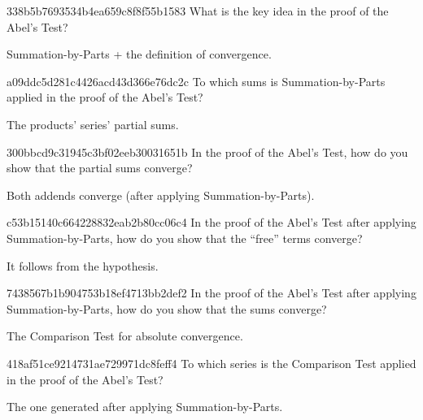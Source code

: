 \begin{note}{338b5b7693534b4ea659c8f8f55b1583}
    What is the key idea in the proof of the Abel's Test?

    \begin{cloze}{1}
        Summation-by-Parts + the definition of convergence.
    \end{cloze}
\end{note}

\begin{note}{a09ddc5d281c4426acd43d366e76dc2c}
    To which sums is Summation-by-Parts applied in the proof of the Abel's Test?

    \begin{cloze}{1}
        The products' series' partial sums.
    \end{cloze}
\end{note}

\begin{note}{300bbcd9c31945c3bf02eeb30031651b}
    In the proof of the Abel's Test, how do you show that the partial sums converge?

    \begin{cloze}{1}
        Both addends converge (after applying Summation-by-Parts).
    \end{cloze}
\end{note}

\begin{note}{c53b15140c664228832eab2b80cc06c4}
    In the proof of the Abel's Test after applying Summation-by-Parts, how do you show that the ``free'' terms converge?

    \begin{cloze}{1}
        It follows from the hypothesis.
    \end{cloze}
\end{note}

\begin{note}{7438567b1b904753b18ef4713bb2def2}
    In the proof of the Abel's Test after applying Summation-by-Parts, how do you show that the sums converge?

    \begin{cloze}{1}
        The Comparison Test for absolute convergence.
    \end{cloze}
\end{note}

\begin{note}{418af51ce9214731ae729971dc8feff4}
    To which series is the Comparison Test applied in the proof of the Abel's Test?

    \begin{cloze}{1}
        The one generated after applying Summation-by-Parts.
    \end{cloze}
\end{note}


